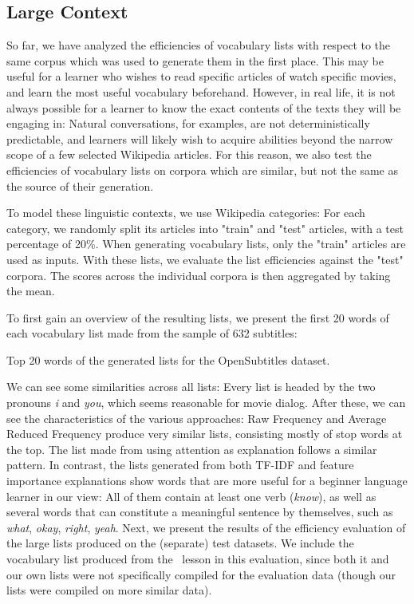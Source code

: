 \subsection{Large Context} \label{sec:results-large-context}
So far, we have analyzed the efficiencies of vocabulary lists with respect to the same corpus which was used to generate them in the first place.
This may be useful for a learner who wishes to read specific articles of watch specific movies, and learn the most useful vocabulary beforehand.
However, in real life, it is not always possible for a learner to know the exact contents of the texts they will be engaging in:
Natural conversations, for examples, are not deterministically predictable, and learners will likely wish to acquire abilities beyond the narrow scope of a few selected Wikipedia articles.
For this reason, we also test the efficiencies of vocabulary lists on corpora which are similar, but not the same as the source of their generation.

To model these linguistic contexts, we use Wikipedia categories:
For each category, we randomly split its articles into "train" and "test" articles, with a test percentage of 20\%.
When generating vocabulary lists, only the "train" articles are used as inputs.
With these lists, we evaluate the list efficiencies against the "test" corpora.
The scores across the individual corpora is then aggregated by taking the mean.

To first gain an overview of the resulting lists, we present the first 20 words of each vocabulary list made from the sample of 632 subtitles:

\begin{table}[H]
	\centering
	
	\caption{Top 20 words of the generated lists for the OpenSubtitles dataset.}
	\label{tbl:first-k-words-opensubs}
\end{table}

We can see some similarities across all lists:
Every list is headed by the two pronouns \textit{i} and \textit{you}, which seems reasonable for movie dialog.
After these, we can see the characteristics of the various approaches:
Raw Frequency and Average Reduced Frequency produce very similar lists, consisting mostly of stop words at the top.
The list made from using attention as explanation follows a similar pattern.
In contrast, the lists generated from both TF-IDF and feature importance explanations show words that are more useful for a beginner language learner in our view:
All of them contain at least one verb (\textit{know}), as well as several words that can constitute a meaningful sentence by themselves, such as \textit{what}, \textit{okay}, \textit{right}, \textit{yeah}.
Next, we present the results of the efficiency evaluation of the large lists produced on the (separate) test datasets.
We include the vocabulary list produced from the \Rosetta\ lesson in this evaluation, since both it and our own lists were not specifically compiled for the evaluation data (though our lists were compiled on more similar data).


